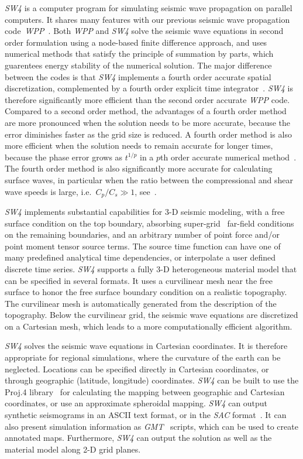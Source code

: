 \documentclass[11pt]{report}
\begin{document}
\emph{SW4} is a computer program for simulating seismic wave propagation on parallel computers. It
shares many features with our previous seismic wave propagation code~\emph{WPP}~\cite{WPP2}. Both
\emph{WPP} and \emph{SW4} solve the seismic wave equations in second order formulation using a
node-based finite difference approach, and uses numerical methods that satisfy the principle of
summation by parts, which guarentees energy stability of the numerical solution. The major
difference between the codes is that \emph{SW4} implements a fourth order accurate spatial
discretization, complemented by a fourth order explicit time integrator~\cite{SjoPet-12}. \emph{SW4}
is therefore significantly more efficient than the second order accurate \emph{WPP} code. Compared
to a second order method, the advantages of a fourth order method are more pronounced when the
solution needs to be more accurate, because the error diminishes faster as the grid size is
reduced. A fourth order method is also more efficient when the solution needs to remain accurate for
longer times, because the phase error grows as $t^{1/p}$ in a $p$th order accurate numerical
method~\cite{Gustafsson-Kreiss-Oliger}. The fourth order method is also significantly more accurate
for calculating surface waves, in particular when the ratio between the compressional and shear wave
speeds is large, i.e.~$C_p/C_s\gg 1$, see~\cite{KrePet-12}.

\emph{SW4} implements substantial capabilities for 3-D seismic modeling, with a free surface
condition on the top boundary, absorbing super-grid~\cite{PetSjo-13} far-field conditions on the
remaining boundaries, and an arbitrary number of point force and/or point moment tensor source
terms. The source time function can have one of many predefined analytical time dependencies, or
interpolate a user defined discrete time series. \emph{SW4} supports a fully 3-D heterogeneous
material model that can be specified in several formats. It uses a curvilinear mesh near the free
surface to honor the free surface boundary condition on a realistic topography. The curvilinear mesh
is automatically generated from the description of the topography. Below the curvilinear grid, the
seismic wave equations are discretized on a Cartesian mesh, which leads to a more computationally
efficient algorithm. 

\emph{SW4} solves the seismic wave equations in Cartesian coordinates. It is therefore appropriate
for regional simulations, where the curvature of the earth can be neglected. Locations can be
specified directly in Cartesian coordinates, or through geographic (latitude, longitude)
coordinates. \emph{SW4} can be built to use the Proj.4 library~\cite{Proj4} for calculating the
mapping between geographic and Cartesian coordinates, or use an approximate spheroidal
mapping. \emph{SW4} can output synthetic seismograms in an ASCII text format, or in the \emph{SAC}
format~\cite{Goldstein-et-al}. It can also present simulation information as
\emph{GMT}~\cite{WesselSmithGMT} scripts, which can be used to create annotated maps. Furthermore,
\emph{SW4} can output the solution as well as the material model along 2-D grid planes.
\end{document}
